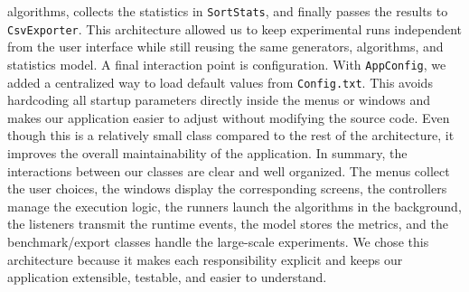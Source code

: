 \documentclass{article}
\begin{document}
algorithms, collects the statistics in \texttt{SortStats}, and finally passes the results
to \texttt{CsvExporter}. This architecture allowed us to keep experimental runs 
independent from the user interface while still reusing the same generators, 
algorithms, and statistics model.
A final interaction point is configuration. With \texttt{AppConfig}, we added a 
centralized way to load default values from \texttt{Config.txt}. This avoids 
hardcoding all startup parameters directly inside the menus or windows and makes 
our application easier to adjust without modifying the source code. Even though this
is a relatively small class compared to the rest of the architecture, it improves the 
overall maintainability of the application.
In summary, the interactions between our classes are clear and well organized. The 
menus collect the user choices, the windows display the corresponding screens, the 
controllers manage the execution logic, the runners launch the algorithms in the 
background, the listeners transmit the runtime events, the model stores the 
metrics, and the benchmark/export classes handle the large-scale experiments. We 
chose this architecture because it makes each responsibility explicit and keeps our 
application extensible, testable, and easier to understand.
\end{document}
